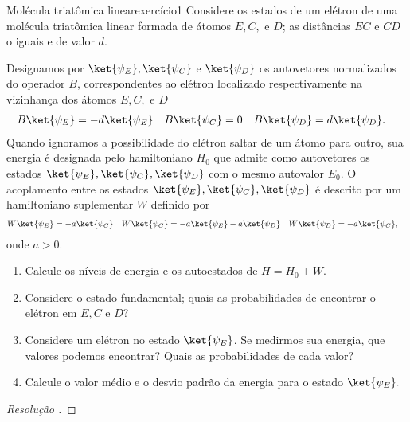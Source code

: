 \begin{exercício}{Molécula triatômica linear}{exercício1}
    Considere os estados de um elétron de uma molécula triatômica linear formada de átomos \(E, C, \) e \(D\); as distâncias \(EC\) e \(CD\) o iguais e de valor \(d\).
    \begin{center}
    \end{center}
    Designamos por \(\ket{\psi_E}, \ket{\psi_C}\) e \(\ket{\psi_D}\) os autovetores normalizados do operador \(B\), correspondentes ao elétron localizado respectivamente na vizinhança dos átomos \(E, C,\) e \(D\)
    \begin{align*}
        B\ket{\psi_E} &= - d\ket{\psi_E}&
        B\ket{\psi_C} &= 0&
        B\ket{\psi_D} &= d\ket{\psi_D}.
    \end{align*}
    Quando ignoramos a possibilidade do elétron saltar de um átomo para outro, sua energia é designada pelo hamiltoniano \(H_0\) que admite como autovetores os estados \(\ket{\psi_E}, \ket{\psi_C}, \ket{\psi_D}\) com o mesmo autovalor \(E_0\). O acoplamento entre os estados \(\ket{\psi_E}, \ket{\psi_C}, \ket{\psi_D}\) é descrito por um hamiltoniano suplementar \(W\) definido por
    \begin{align*}
        W \ket{\psi_E} &= -a \ket{\psi_C}&
        W \ket{\psi_C} &= -a \ket{\psi_E} - a \ket{\psi_D}&
        W \ket{\psi_D} &= -a \ket{\psi_C},
    \end{align*}
    onde \(a > 0\).
    \begin{enumerate}[label=(\alph*)]
        \item Calcule os níveis de energia e os autoestados de \(H = H_0 + W\).
        \item Considere o estado fundamental; quais as probabilidades de encontrar o elétron em \(E, C\) e \(D\)?
        \item Considere um elétron no estado \(\ket{\psi_E}\). Se medirmos sua energia, que valores podemos encontrar? Quais as probabilidades de cada valor?
        \item Calcule o valor médio e o desvio padrão da energia para o estado \(\ket{\psi_E}.\)
    \end{enumerate}
\end{exercício}
\begin{proof}[Resolução ]

\end{proof}

